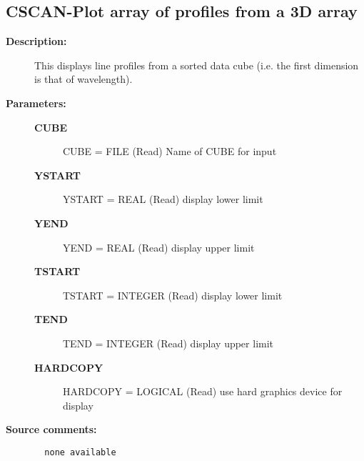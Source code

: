 \subsection{CSCAN-\label{CSCAN}Plot array of profiles from a 3D array}
\begin{description}

\item [{\bf Description:}]
   This displays line profiles
   from a sorted data cube (i.e. the first dimension is that of
   wavelength).

\item [{\bf Parameters:}]
\begin{description}
\item [{\bf CUBE}]
    CUBE = FILE (Read)
        Name of CUBE for input
\item [{\bf YSTART}]
    YSTART = REAL (Read)
        display lower limit
\item [{\bf YEND}]
    YEND = REAL (Read)
        display upper limit
\item [{\bf TSTART}]
    TSTART = INTEGER (Read)
        display lower limit
\item [{\bf TEND}]
    TEND = INTEGER (Read)
        display upper limit
\item [{\bf HARDCOPY}]
    HARDCOPY = LOGICAL (Read)
        use hard graphics device for display
\end{description}

\item [{\bf Source comments:}]
\begin{verbatim}
  none available

\end{verbatim}
\end{description}
